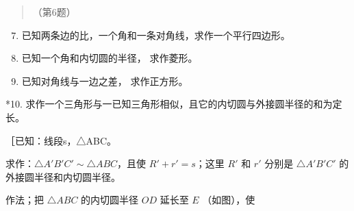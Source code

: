 \begin{quote}
（第6题）
\end{quote}

\begin{enumerate}
\setcounter{enumi}{6}
\item
  已知两条边的比，一个角和一条对角线，求作一个平行四边形。
\item
  已知一个角和内切圆的半径， 求作菱形。
\item
  已知对角线与一边之差， 求作正方形。
\end{enumerate}

*10.
求作一个三角形与一已知三角形相似，且它的内切圆与外接圆半径的和为定长。

［已知：线段s，△ABC。

求作：\(\triangle A'B'C' \sim \triangle ABC\)，且使
\(R' + r' = s\)；这里 \(R'\) 和 \(r'\) 分别是 \(\triangle A'B'C'\)
的外接圆半径和内切圆半径。

作法；把 \(\triangle ABC\) 的内切圆半径 \(OD\) 延长至 \(E\) （如图），使

